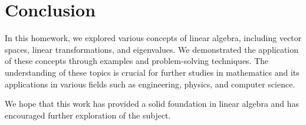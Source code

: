 \documentclass{article}
\begin{document}
\section{Conclusion}

In this homework, we explored various concepts of linear algebra, including vector spaces, linear transformations, and eigenvalues. We demonstrated the application of these concepts through examples and problem-solving techniques. The understanding of these topics is crucial for further studies in mathematics and its applications in various fields such as engineering, physics, and computer science.

We hope that this work has provided a solid foundation in linear algebra and has encouraged further exploration of the subject.
\end{document}
